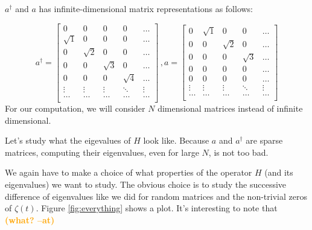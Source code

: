 \documentclass{amsproc}
\newcommand{\at}[1]{\textbf{\textcolor{orange}{(#1 --at)}}}
\theoremstyle{definition}
\theoremstyle{remark}
\numberwithin{equation}{section}
\begin{document}
$a^{\dagger}$ and $a$ has infinite-dimensional matrix representations as follows:

\[
a^{\dagger}
=
\begin{bmatrix}
    0        & 0        & 0        &  0       & \dots  \\
    \sqrt{1} & 0        & 0        &  0       & \dots   \\
    0        & \sqrt{2} & 0        &  0       &\dots   \\
    0        & 0        & \sqrt{3} &  0       & \dots   \\
    0        & 0        & 0        & \sqrt{4} & \dots   \\
    \vdots & \vdots & \vdots & \ddots & \vdots \\
    \hdots & \hdots & \hdots & \hdots & \hdots \\
\end{bmatrix} \, ,
a
=
\begin{bmatrix}
    0        & \sqrt{1} & 0        &  0       & \dots  \\
    0        & 0        & \sqrt{2} &  0       & \dots   \\
    0        & 0        & 0        & \sqrt{3} &\dots   \\
    0        & 0        & 0        &  0       & \dots   \\
    0        & 0        & 0        &  0 & \dots   \\
    \vdots & \vdots & \vdots & \ddots & \vdots \\
    \hdots & \hdots & \hdots & \hdots & \hdots \\
\end{bmatrix}
\]
For our computation, we will consider $N$ dimensional matrices instead of infinite dimensional. 

Let's study what the eigevalues of $H$ look like. Because $a$ and $a^{\dagger}$ are sparse matrices, computing their eigenvalues, even for large $N$, is not too bad. 

We again have to make a choice of what properties of the operator $H$ (and its eigenvalues) we want to study. The obvious choice is to study the successive difference of eigenvalues like we did for random matrices and the non-trivial zeros of $\zeta(t)$. Figure \ref{fig:everything} shows a plot. It's interesting to note that \at{what?}
\end{document}
